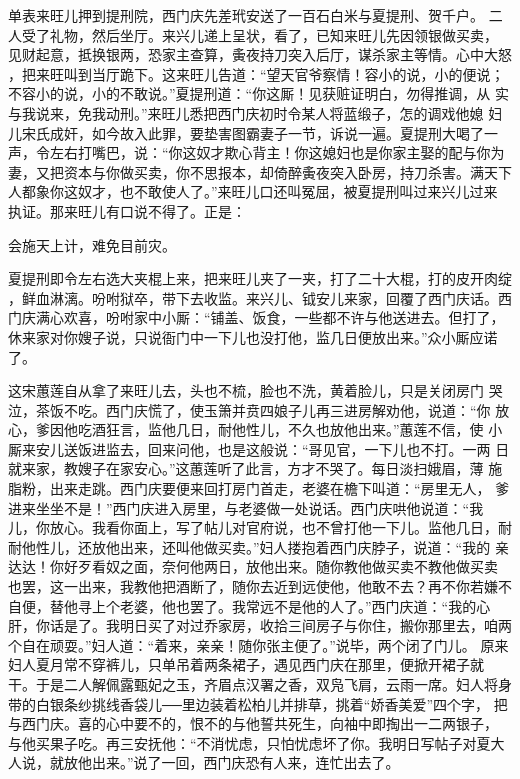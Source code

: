 单表来旺儿押到提刑院，西门庆先差玳安送了一百石白米与夏提刑、贺千户。
二人受了礼物，然后坐厅。来兴儿递上呈状，看了，已知来旺儿先因领银做买卖，
见财起意，抵换银两，恐家主查算，夤夜持刀突入后厅，谋杀家主等情。心中大怒
，把来旺叫到当厅跪下。这来旺儿告道：“望天官爷察情！容小的说，小的便说；
不容小的说，小的不敢说。”夏提刑道：“你这厮！见获赃证明白，勿得推调，从
实与我说来，免我动刑。”来旺儿悉把西门庆初时令某人将蓝缎子，怎的调戏他媳
妇儿宋氏成奸，如今故入此罪，要垫害图霸妻子一节，诉说一遍。夏提刑大喝了一
声，令左右打嘴巴，说：“你这奴才欺心背主！你这媳妇也是你家主娶的配与你为
妻，又把资本与你做买卖，你不思报本，却倚醉夤夜突入卧房，持刀杀害。满天下
人都象你这奴才，也不敢使人了。”来旺儿口还叫冤屈，被夏提刑叫过来兴儿过来
执证。那来旺儿有口说不得了。正是：

会施天上计，难免目前灾。

夏提刑即令左右选大夹棍上来，把来旺儿夹了一夹，打了二十大棍，打的皮开肉绽
，鲜血淋漓。吩咐狱卒，带下去收监。来兴儿、钺安儿来家，回覆了西门庆话。西
门庆满心欢喜，吩咐家中小厮：“铺盖、饭食，一些都不许与他送进去。但打了，
休来家对你嫂子说，只说衙门中一下儿也没打他，监几日便放出来。”众小厮应诺
了。

这宋蕙莲自从拿了来旺儿去，头也不梳，脸也不洗，黄着脸儿，只是关闭房门
哭泣，茶饭不吃。西门庆慌了，使玉箫并贲四娘子儿再三进房解劝他，说道：“你
放心，爹因他吃酒狂言，监他几日，耐他性儿，不久也放他出来。”蕙莲不信，使
小厮来安儿送饭进监去，回来问他，也是这般说：“哥见官，一下儿也不打。一两
日就来家，教嫂子在家安心。”这蕙莲听了此言，方才不哭了。每日淡扫娥眉，薄
施脂粉，出来走跳。西门庆要便来回打房门首走，老婆在檐下叫道：“房里无人，
爹进来坐坐不是！”西门庆进入房里，与老婆做一处说话。西门庆哄他说道：“我
儿，你放心。我看你面上，写了帖儿对官府说，也不曾打他一下儿。监他几日，耐
耐他性儿，还放他出来，还叫他做买卖。”妇人搂抱着西门庆脖子，说道：“我的
亲达达！你好歹看奴之面，奈何他两日，放他出来。随你教他做买卖不教他做买卖
也罢，这一出来，我教他把酒断了，随你去近到远使他，他敢不去？再不你若嫌不
自便，替他寻上个老婆，他也罢了。我常远不是他的人了。”西门庆道：“我的心
肝，你话是了。我明日买了对过乔家房，收拾三间房子与你住，搬你那里去，咱两
个自在顽耍。”妇人道：“着来，亲亲！随你张主便了。”说毕，两个闭了门儿。
原来妇人夏月常不穿裤儿，只单吊着两条裙子，遇见西门庆在那里，便掀开裙子就
干。于是二人解佩露甄妃之玉，齐眉点汉署之香，双凫飞肩，云雨一席。妇人将身
带的白银条纱挑线香袋儿──里边装着松柏儿并排草，挑着“娇香美爱”四个字，
把与西门庆。喜的心中要不的，恨不的与他誓共死生，向袖中即掏出一二两银子，
与他买果子吃。再三安抚他：“不消忧虑，只怕忧虑坏了你。我明日写帖子对夏大
人说，就放他出来。”说了一回，西门庆恐有人来，连忙出去了。


